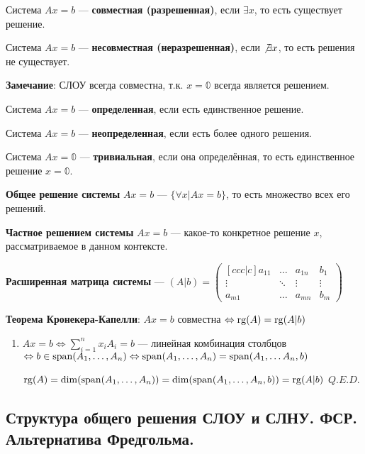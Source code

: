 Система \(Ax = b\) --- \textbf{совместная (разрешенная)}, если \(\exists x\), то есть существует решение.

Система \(Ax = b\) --- \textbf{несовместная (неразрешенная)}, если \(\not\exists x\), то есть решения не существует.

\textbf{Замечание}: СЛОУ всегда совместна, т.к. \(x = \mathbb{0}\) всегда является решением.

Система \(Ax = b\) --- \textbf{определенная}, если есть единственное решение.

Система \(Ax = b\) --- \textbf{неопределенная}, если есть более одного решения.

Система \(Ax = \mathbb{0}\) --- \textbf{тривиальная}, если она определённая, то есть единственное решение \(x = \mathbb{0}\).

\textbf{Общее решение системы} \(Ax = b\) --- \(\{\forall x | Ax = b\}\), то есть множество всех его решений.

\textbf{Частное решением системы} \(Ax = b\) --- какое-то конкретное решение \(x\), рассматриваемое в данном контексте.

\textbf{Расширенная матрица системы} --- \((A | b) =
\begin{pmatrix}[ccc|c]
    a_{11} & \ldots & a_{1n} & b_1    \\
    \vdots & \ddots & \vdots & \vdots \\
    a_{m1} & \ldots & a_{mn} & b_m
\end{pmatrix}\)

\textbf{Теорема Кронекера-Капелли}: \(Ax = b\) совместна \(\Leftrightarrow \operatorname{rg}(A) = \operatorname{rg}(A|b)\)

\begin{enumerate}
    \item[] \prooff{}
          \(Ax = b \Leftrightarrow \sum\limits_{i=1}^n x_i A_i = b\) --- линейная комбинация столбцов \(\Leftrightarrow b \in \operatorname{span}(A_1, \ldots, A_n) \Leftrightarrow \operatorname{span}(A_1, \ldots, A_n) = \operatorname{span}(A_1,\ldots A_n, b)\)

          \(\operatorname{rg}(A) = \dim(\operatorname{span}(A_1,\ldots, A_n)) = \dim(\operatorname{span}(A_1, \ldots, A_n, b)) = \operatorname{rg}(A | b)\) \(Q.E.D.\)

\end{enumerate}


\subsection{Структура общего решения СЛОУ и СЛНУ. ФСР. Альтернатива Фредгольма.}

